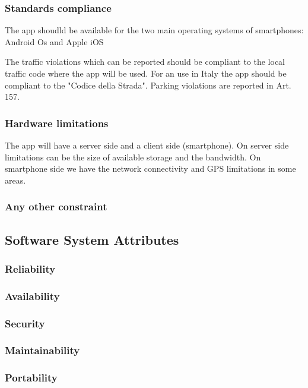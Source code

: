 \subsubsection{Standards compliance}
The app shoudld be available for the two main operating systems of smartphones: Android Os and Apple iOS

The traffic violations which can be reported should be compliant to the local traffic code where the app will be used.
For an use in Italy the app should be compliant to the "Codice della Strada". Parking violations are reported in Art. 157.



\subsubsection{Hardware limitations}
The app will have a server side and a client side (smartphone).
On server side limitations can be the size of available storage and the bandwidth.
On smartphone side we have the network connectivity and GPS limitations in some areas.

\subsubsection{Any other constraint}



\subsection{Software System Attributes} %
\subsubsection{Reliability}
\subsubsection{Availability}
\subsubsection{Security}
\subsubsection{Maintainability}
\subsubsection{Portability}
